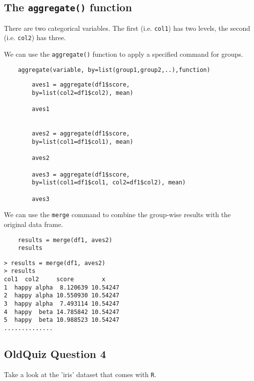 \documentclass[]{article}
\begin{document}
\subsection*{The \texttt{aggregate()} function}
\noindent There are two categorical variables. The first (i.e. \texttt{col1}) has two levels, the second (i.e. \texttt{col2}) has three. 


\noindent We can use the \texttt{aggregate()} function to apply a specified command for groups.
{
	\large
	\begin{verbatim}
	aggregate(variable, by=list(group1,group2,..),function)
	\end{verbatim}
	
	\begin{framed}
		
		\begin{verbatim}
		aves1 = aggregate(df1$score, 
		by=list(col2=df1$col2), mean)
		
		aves1
		
		
		aves2 = aggregate(df1$score, 
		by=list(col1=df1$col1), mean)
		
		aves2
		
		aves3 = aggregate(df1$score,
		by=list(col1=df1$col1, col2=df1$col2), mean)
		
		aves3
		\end{verbatim}
	\end{framed}
}
\newpage
\noindent We can use the \texttt{merge} command to combine the group-wise results with the original data frame.
\begin{framed}
	\begin{verbatim}
	results = merge(df1, aves2) 
	results
	\end{verbatim}
\end{framed}

\begin{verbatim}
> results = merge(df1, aves2) 
> results
col1  col2     score        x
1  happy alpha  8.120639 10.54247
2  happy alpha 10.550930 10.54247
3  happy alpha  7.493114 10.54247
4  happy  beta 14.785842 10.54247
5  happy  beta 10.988523 10.54247
..............
\end{verbatim}
\newpage
\subsection*{OldQuiz Question 4}
Take a look at the 'iris' dataset that comes with \texttt{R}. 
\end{document}
